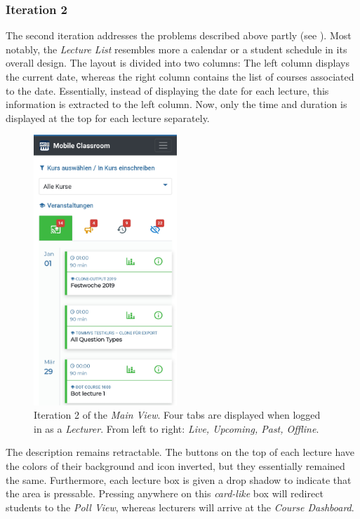 \subsubsection{Iteration 2}
The second iteration addresses the problems described above partly (see ). Most notably, the \emph{Lecture List} resembles more a calendar or a student schedule in its overall design. The layout is divided into two columns: The left column displays the current date, whereas the right column contains the list of courses associated to the date. Essentially, instead of displaying the date for each lecture, this information is extracted to the left column. Now, only the time and duration is displayed at the top for each lecture separately.
\begin{figure}
	\vspace*{-0.5cm}
	\begin{center}
		\includegraphics[width=0.48\textwidth]{screenshots/redesign/main_view_iteration_2.jpg}
	\end{center}
	\caption{Iteration 2 of the \emph{Main View}. Four tabs are displayed when logged in as a \emph{Lecturer}. From left to right: \emph{Live, Upcoming, Past, Offline}.}
	\label{fig:main_view:_it2}
	\vspace*{-1.5cm}
\end{figure}
The description remains retractable. The buttons on the top of each lecture have the colors of their background and icon inverted, but they essentially remained the same.
Furthermore, each lecture box is given a drop shadow to indicate that the area is pressable. Pressing anywhere on this \emph{card-like} box will redirect students to the \emph{Poll View}, whereas lecturers will arrive at the \emph{Course Dashboard}.

